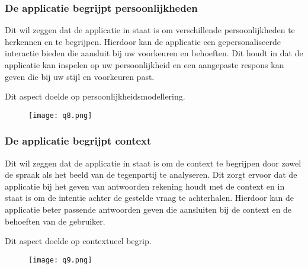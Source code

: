 \subsubsection{De applicatie begrijpt persoonlijkheden}

Dit wil zeggen dat de applicatie in staat is om verschillende persoonlijkheden te herkennen en te begrijpen. Hierdoor kan de applicatie een gepersonaliseerde interactie bieden die aansluit bij uw voorkeuren en behoeften. Dit houdt in dat de applicatie kan inspelen op uw persoonlijkheid en een aangepaste respons kan geven die bij uw stijl en voorkeuren past.

Dit aspect doelde op persoonlijkheidsmodellering.

\begin{figure}[htbp]
    \centering
    \texttt{[image: q8.png]}
    \label{fig:vraag_8_resultaat}
\end{figure}

\subsubsection{De applicatie begrijpt context}

Dit wil zeggen dat de applicatie in staat is om de context te begrijpen door zowel de spraak als het beeld van de tegenpartij te analyseren. Dit zorgt ervoor dat de applicatie bij het geven van antwoorden rekening houdt met de context en in staat is om de intentie achter de gestelde vraag te achterhalen. Hierdoor kan de applicatie beter passende antwoorden geven die aansluiten bij de context en de behoeften van de gebruiker.

Dit aspect doelde op contextueel begrip.

\begin{figure}[htbp]
    \centering
    \texttt{[image: q9.png]}
    \label{fig:vraag_9_resultaat}
\end{figure}